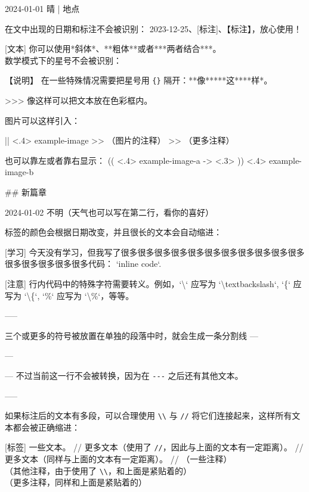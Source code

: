 \documentclass[11pt, paperstyle=light yellow, color entry,
  title in boldface, title in sffamily, use style = classical]{jwjournal}
\begin{document}
2024-01-01 晴 | 地点

  在文中出现的日期和标注不会被识别： 2023-12-25、[标注]、【标注】，放心使用！

  [文本]
    你可以使用*斜体*、**粗体**或者***两者结合***。
    \\
    数学模式下的星号不会被识别：

  【说明】 %
    在一些特殊情况需要把星号用 \texttt{\{\}} 隔开：**像**{}***这***{}*样*。

  >>> 像这样可以把文本放在色彩框内。

  图片可以这样引入：

  || <.4> {example-image} %
  >> （图片的注释）
  >> （更多注释）

  也可以靠左或者靠右显示：
  (( <.4> {example-image-a} %
  -> <.3> %
  )) <.4> {example-image-b} %


## {新篇章}

2024-01-02
不明（天气也可以写在第二行，看你的喜好）

  标签的颜色会根据日期改变，并且很长的文本会自动缩进：

  [学习] 今天没有学习，但我写了很多很多很多很多很多很多很多很多很多很多很多很多很多很多很多很多代码： `inline code`.

  [注意] 行内代码中的特殊字符需要转义。例如，`\textbackslash` 应写为 `\textbackslash textbackslash`, `\{` 应写为 `\textbackslash\{`, `\%` 应写为 `\textbackslash\%`，等等。

  -----

  三个或更多的\textquote{\texttt{-}}符号被放置在单独的段落中时，就会生成一条分割线 ---

  ---

  --- 不过当前这一行不会被转换，因为在 \texttt{-}\texttt{-}\texttt{-} 之后还有其他文本。

  -----

  如果标注后的文本有多段，可以合理使用 \texttt{\textbackslash\textbackslash} 与 \texttt{\slash\slash} 将它们连接起来，这样所有文本都会被正确缩进：

  [标签] 一些文本。
    //
    更多文本（使用了 \texttt{\slash\slash}，因此与上面的文本有一定距离）。
    //
    更多文本（同样与上面的文本有一定距离）。
    //
    （一些注释）
    \\
    （其他注释，由于使用了 \texttt{\textbackslash\textbackslash}，和上面是紧贴着的）
    \\
    （更多注释，同样和上面是紧贴着的）
\end{document}
